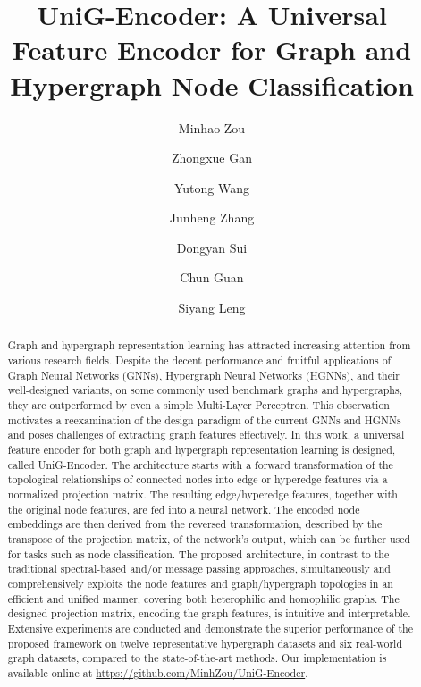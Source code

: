 \documentclass[review]{elsarticle}
\begin{document}
\begin{frontmatter}

\title{UniG-Encoder: A Universal Feature Encoder for Graph and Hypergraph Node Classification}

\author[mymainaddress]{Minhao Zou}

\author[mymainaddress]{Zhongxue Gan}

\author[mymainaddress]{Yutong Wang}

\author[mymainaddress]{Junheng Zhang}

\author[mymainaddress]{Dongyan Sui}

\author[mymainaddress]{Chun Guan}

\author[mymainaddress,iics]{Siyang Leng}

\address[mymainaddress]{Institute of AI and Robotics, Academy for Engineering and Technology, Fudan University, Shanghai 200433, China}
\address[iics]{Research Institute of Intelligent Complex Systems, Fudan University, Shanghai 200433, China}

\begin{abstract}
Graph and hypergraph representation learning has attracted increasing attention from various research fields. Despite the decent performance and fruitful applications of Graph Neural Networks (GNNs), Hypergraph Neural Networks (HGNNs), and their well-designed variants, on some commonly used benchmark graphs and hypergraphs, they are outperformed by even a simple Multi-Layer Perceptron. This observation motivates a reexamination of the design paradigm of the current GNNs and HGNNs and poses challenges of extracting graph features effectively. In this work, a universal feature encoder for both graph and hypergraph representation learning is designed, called UniG-Encoder. The architecture starts with a forward transformation of the topological relationships of connected nodes into edge or hyperedge features via a normalized projection matrix. The resulting edge/hyperedge features, together with the original node features, are fed into a neural network. The encoded node embeddings are then derived from the reversed transformation, described by the transpose of the projection matrix, of the network's output, which can be further used for tasks such as node classification. The proposed architecture, in contrast to the traditional spectral-based and/or message passing approaches, simultaneously and comprehensively exploits the node features and graph/hypergraph topologies in an efficient and unified manner, covering both heterophilic and homophilic graphs. The designed projection matrix, encoding the graph features, is intuitive and interpretable. Extensive experiments are conducted and demonstrate the superior performance of the proposed framework on twelve representative hypergraph datasets and six real-world graph datasets, compared to the state-of-the-art methods. Our implementation is available online at \url{https://github.com/MinhZou/UniG-Encoder}.
\end{abstract}


\end{frontmatter}
\end{document}
